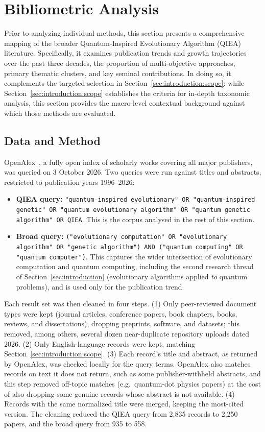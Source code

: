 \section{Bibliometric Analysis}
\label{sec:bibliometric}

Prior to analyzing individual methods, this section presents a
comprehensive mapping of the broader Quantum-Inspired Evolutionary
Algorithm (QIEA) literature. Specifically, it examines publication
trends and growth trajectories over the past three decades, the
proportion of multi-objective approaches, primary thematic clusters,
and key seminal contributions. In doing so, it complements the targeted
selection in Section~\ref{sec:introduction:scope}: while
Section~\ref{sec:introduction:scope} establishes the criteria for
in-depth taxonomic analysis, this section provides the macro-level
contextual background against which those methods are evaluated.

\subsection{Data and Method}
\label{sec:bibliometric:method}

OpenAlex~\citep{priem2022openalex}, a fully open index of
scholarly works covering all major publishers, was queried on 3 October 2026. Two
queries were run against titles and abstracts, restricted to
publication years 1996--2026:
\begin{itemize}
  \item \textbf{QIEA query:} \texttt{"quantum-inspired evolutionary" OR
    "quantum-inspired genetic" OR "quantum evolutionary algorithm" OR
    "quantum genetic algorithm" OR QIEA}. This is the corpus analysed in
    the rest of this section.
  \item \textbf{Broad query:} \texttt{("evolutionary computation" OR
    "evolutionary algorithm" OR "genetic algorithm") AND ("quantum
    computing" OR "quantum computer")}. This captures the wider
    intersection of evolutionary computation and quantum computing,
    including the second research thread of
    Section~\ref{sec:introduction} (evolutionary algorithms applied
    \emph{to} quantum problems), and is used only for the publication
    trend.
\end{itemize}
Each result set was then cleaned in four steps. (1) Only peer-reviewed
document types were kept (journal articles, conference papers, book
chapters, books, reviews, and dissertations), dropping preprints,
software, and datasets; this removed, among others, several dozen
near-duplicate repository uploads dated 2026. (2) Only English-language
records were kept, matching Section~\ref{sec:introduction:scope}. (3)
Each record's title and abstract, as returned by OpenAlex, was checked
locally for the query terms. OpenAlex also matches records on text it
does not return, such as some publisher-withheld abstracts, and this
step removed off-topic matches (e.g.\ quantum-dot physics papers) at the
cost of also dropping some genuine records whose abstract is not
available. (4) Records with the same normalized title were merged,
keeping the most-cited version. The cleaning reduced the QIEA query
from 2{,}835 records to 2{,}250 papers, and the broad query from 935
to 558.

